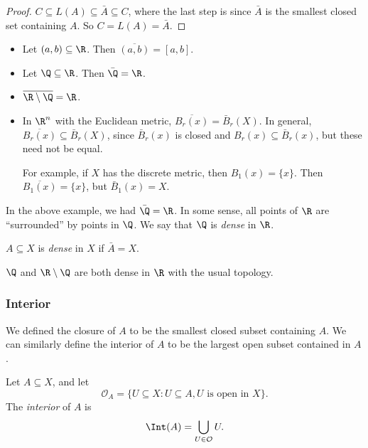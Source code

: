 \documentclass[a4paper]{article}
\begin{document}
\begin{proof}
  $C\subseteq L(A) \subseteq \bar A \subseteq C$, where the last step is since $\bar A$ is the smallest closed set containing $A$. So $C = L(A) = \bar A$.
\end{proof}

\begin{eg}\leavevmode
  \begin{itemize}
    \item Let $(a, b)\subseteq \R$. Then $\overline{(a, b)} = [a, b]$.
    \item Let $\Q\subseteq \R$. Then $\bar\Q = \R$.
    \item $\overline{\R \setminus \Q} = \R$.
    \item In $\R^n$ with the Euclidean metric, $\overline{B_r(x)} = \bar B_r(X)$. In general, $\overline{B_r(x)}\subseteq \bar B_r(X)$, since $\bar B_r(x)$ is closed and $B_r(x) \subseteq \bar B_r(x)$, but these need not be equal.

      For example, if $X$ has the discrete metric, then $B_1(x) = \{x\}$. Then $\overline{B_1(x)} = \{x\}$, but $\bar B_1(x) = X$.
  \end{itemize}
\end{eg}

In the above example, we had $\bar\Q = \R$. In some sense, all points of $\R$ are ``surrounded'' by points in $\Q$. We say that $\Q$ is \emph{dense} in $\R$.
\begin{defi}
  $A\subseteq X$ is \emph{dense} in $X$ if $\bar A = X$.
\end{defi}

\begin{eg}
  $\Q$ and $\R\setminus \Q$ are both dense in $\R$ with the usual topology.
\end{eg}

\subsubsection{Interior}
We defined the closure of $A$ to be the smallest closed subset containing $A$. We can similarly define the interior of $A$ to be the largest open subset contained in $A$.

\begin{defi}[Interior]
  Let $A\subseteq X$, and let 
  \[
    \mathcal{O}_A = \{U\subseteq X: U\subseteq A, U\text{ is open in }X\}.
  \]
  The \emph{interior} of $A$ is
  \[
    \Int(A) = \bigcup_{U\in \mathcal{O}} U.
  \]
\end{defi}
\end{document}
